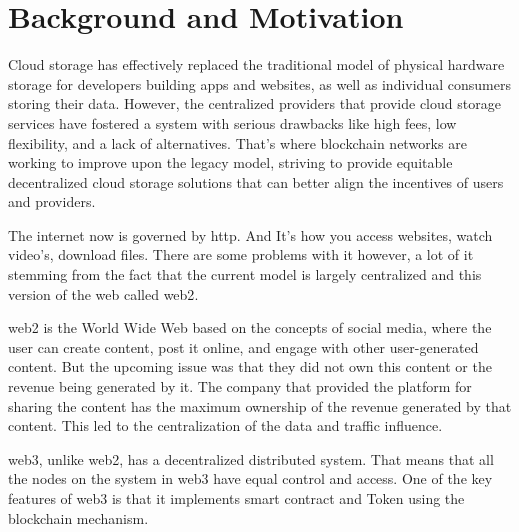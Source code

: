 
\section{Background and Motivation}

Cloud storage has effectively replaced the traditional model of physical hardware storage for developers building apps and websites, as well as individual consumers storing their data. However, the centralized providers that provide cloud storage services have fostered a system with serious drawbacks like high fees, low flexibility, and a lack of alternatives. That’s where blockchain networks are working to improve upon the legacy model, striving to provide equitable decentralized cloud storage solutions that can better align the incentives of users and providers.

The internet now is governed by \acrfull{http}. And It’s how you access websites, watch video’s, download files. There are some problems with it however, a lot of it stemming from the fact that the current model is largely \gls{centralized} and this version of the web called \gls{web2}.

\Gls{web2} is the World Wide Web based on the concepts of social media, where the user can create content, post it online, and engage with other user-generated content. But the upcoming issue was that they did not own this content or the revenue being generated by it. The company that provided the platform for sharing the content has the maximum ownership of the revenue generated by that content. This led to the centralization of the data and traffic influence.

\Gls{web3}, unlike \gls{web2}, has a \gls{decentralized} distributed system. That means that all the nodes on the system in \gls{web3} have equal control and access. One of the key features of \gls{web3} is that it implements \gls{smart contract} and Token using the \gls{blockchain} mechanism.